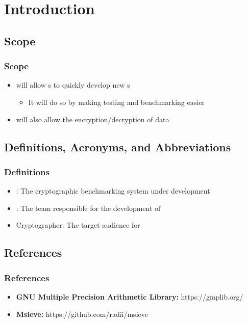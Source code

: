 
\section{Introduction}


\subsection{Scope}

\begin{frame}
\frametitle{Scope}
\begin{itemize}
\item \cry{} will allow \cg s to quickly develop new \cs{}s
\begin{itemize}
  \item It will do so by making testing and benchmarking
  easier
\end{itemize}
\item \cry{} will also allow the encryption/decryption of
data
\end{itemize}
\end{frame}


\subsection{Definitions, Acronyms, and Abbreviations}

\begin{frame}
\frametitle{Definitions}
\begin{itemize}
\item \cry{}: The cryptographic benchmarking system
under development
\item \tc{}: The team responsible for the
development of \cry{}
\item Cryptographer: The target audience for \cry{}
\end{itemize}
\end{frame}


\subsection{References}

\begin{frame}
\frametitle{References}
\begin{itemize}
  \item \textbf{GNU Multiple Precision Arithmetic Library:}
        https://gmplib.org/
  \item \textbf{Msieve:} https://github.com/radii/msieve
\end{itemize}
\end{frame}

